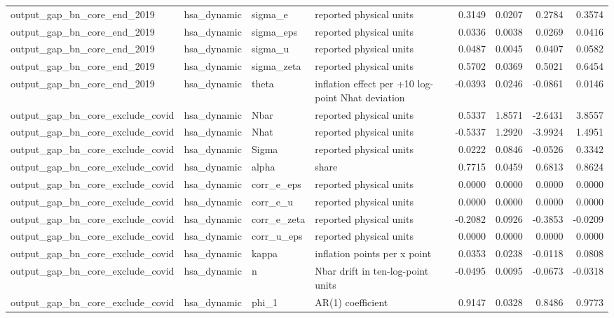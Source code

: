 \begin{tabular}{llllrrrr}
output\_gap\_bn\_core\_end\_2019 & hsa\_dynamic & sigma\_e & reported physical units & 0.3149 & 0.0207 & 0.2784 & 0.3574 \\
output\_gap\_bn\_core\_end\_2019 & hsa\_dynamic & sigma\_eps & reported physical units & 0.0336 & 0.0038 & 0.0269 & 0.0416 \\
output\_gap\_bn\_core\_end\_2019 & hsa\_dynamic & sigma\_u & reported physical units & 0.0487 & 0.0045 & 0.0407 & 0.0582 \\
output\_gap\_bn\_core\_end\_2019 & hsa\_dynamic & sigma\_zeta & reported physical units & 0.5702 & 0.0369 & 0.5021 & 0.6454 \\
output\_gap\_bn\_core\_end\_2019 & hsa\_dynamic & theta & inflation effect per +10 log-point Nhat deviation & -0.0393 & 0.0246 & -0.0861 & 0.0146 \\
output\_gap\_bn\_core\_exclude\_covid & hsa\_dynamic & Nbar & reported physical units & 0.5337 & 1.8571 & -2.6431 & 3.8557 \\
output\_gap\_bn\_core\_exclude\_covid & hsa\_dynamic & Nhat & reported physical units & -0.5337 & 1.2920 & -3.9924 & 1.4951 \\
output\_gap\_bn\_core\_exclude\_covid & hsa\_dynamic & Sigma & reported physical units & 0.0222 & 0.0846 & -0.0526 & 0.3342 \\
output\_gap\_bn\_core\_exclude\_covid & hsa\_dynamic & alpha & share & 0.7715 & 0.0459 & 0.6813 & 0.8624 \\
output\_gap\_bn\_core\_exclude\_covid & hsa\_dynamic & corr\_e\_eps & reported physical units & 0.0000 & 0.0000 & 0.0000 & 0.0000 \\
output\_gap\_bn\_core\_exclude\_covid & hsa\_dynamic & corr\_e\_u & reported physical units & 0.0000 & 0.0000 & 0.0000 & 0.0000 \\
output\_gap\_bn\_core\_exclude\_covid & hsa\_dynamic & corr\_e\_zeta & reported physical units & -0.2082 & 0.0926 & -0.3853 & -0.0209 \\
output\_gap\_bn\_core\_exclude\_covid & hsa\_dynamic & corr\_u\_eps & reported physical units & 0.0000 & 0.0000 & 0.0000 & 0.0000 \\
output\_gap\_bn\_core\_exclude\_covid & hsa\_dynamic & kappa & inflation points per x point & 0.0353 & 0.0238 & -0.0118 & 0.0808 \\
output\_gap\_bn\_core\_exclude\_covid & hsa\_dynamic & n & Nbar drift in ten-log-point units & -0.0495 & 0.0095 & -0.0673 & -0.0318 \\
output\_gap\_bn\_core\_exclude\_covid & hsa\_dynamic & phi\_1 & AR(1) coefficient & 0.9147 & 0.0328 & 0.8486 & 0.9773 \\

\end{tabular}
